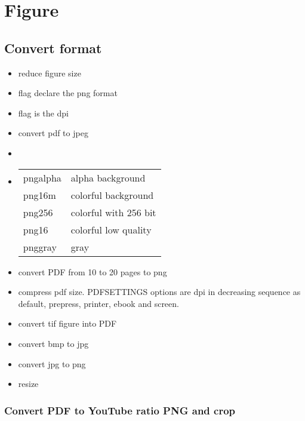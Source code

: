 \chapter{Figure}

\section{Convert format}

\begin{itemize}
\item {} reduce figure size
\item flag  declare the png format
\item flag  is the dpi
\item {} convert pdf to jpeg
\item {}
\item 
\begin{tabular}{ll}
\hline
pngalpha & alpha background\\
png16m & colorful background\\
png256 & colorful with 256 bit\\
png16 & colorful low quality\\
pnggray & gray\\
\hline
\end{tabular}
\item {} convert PDF from 10 to 20 pages to png
\item {} compress pdf size. PDFSETTINGS options are dpi in decreasing sequence as default, prepress, printer, ebook and screen.
\item {} convert tif figure into PDF
\item {} convert bmp to jpg
\item {} convert jpg to png
\item {} resize
\end{itemize}

\subsection{Convert PDF to YouTube ratio PNG and crop}

